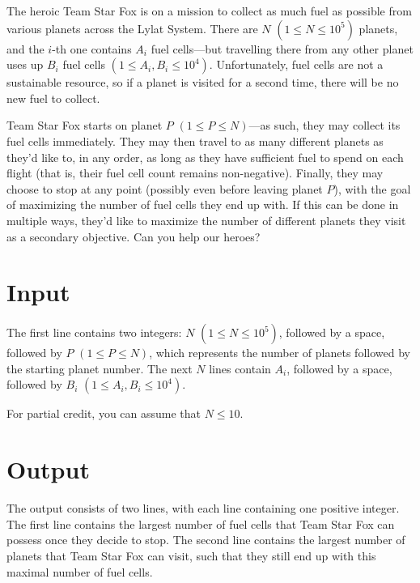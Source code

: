 
The heroic Team Star Fox is on a mission to collect as much fuel as possible
from various planets across the Lylat System. There are $N$ $(1 \leq N \leq 10^5)$ planets, and the
$i$-th one contains $A_i$ fuel cells---but travelling there from any other planet uses up $B_i$ fuel
cells $(1 \leq A_i,B_i \leq 10^4)$. Unfortunately, fuel cells are not a sustainable resource, so if
a planet is visited for a second time, there will be no new fuel to collect.

Team Star Fox starts on planet $P$ $(1 \leq P \leq N)$---as such, they may collect its fuel cells
immediately. They may then travel to as many different planets as they'd like to, in any order, as
long as they have sufficient fuel to spend on each flight (that is, their fuel cell count remains
non-negative). Finally, they may choose to stop at any point (possibly even before leaving planet
$P$), with the goal of maximizing the number of fuel cells they end up with. If this can be done in
multiple ways, they'd like to maximize the number of different planets they visit as a secondary
objective. Can you help our heroes?

\section*{Input}
The first line contains two integers: $N$ $(1 \leq N \leq 10^5)$, followed by a space, followed by
$P$ $(1 \leq P \leq N)$, which represents the number of planets followed by the starting planet
number. The next $N$ lines contain $A_i$, followed by a space, followed by $B_i$ $(1 \leq A_i, B_i
\leq 10^4)$.

For partial credit, you can assume that $N \leq 10$.

\section*{Output}
The output consists of two lines, with each line containing one positive integer. The first line
contains the largest number of fuel cells that Team Star Fox can possess once they decide to stop.
The second line contains the largest number of planets that Team Star Fox can visit, such that they
still end up with this maximal number of fuel cells.
